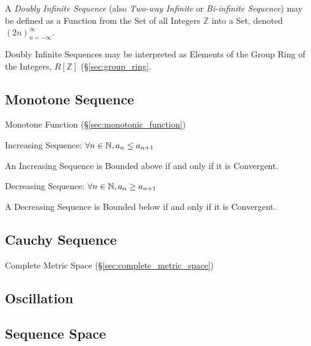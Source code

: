 A \emph{Doubly Infinite Sequence} (also \emph{Two-way Infinite} or
\emph{Bi-infinite Sequence}) may be defined as a Function from the Set
of all Integers $\mathbb{Z}$ into a Set, denoted
$(2n)^{\infty}_{n=-\infty}$.

Doubly Infinite Sequences may be interpreted as Elements of the Group
Ring of the Integers, $R[\mathbb{Z}]$ (\S\ref{sec:group_ring}.



\subsection{Monotone Sequence}\label{sec:monotone_sequence}

Monotone Function (\S\ref{sec:monotonic_function})

Increasing Sequence: $\forall n \in \mathbb{N}, a_n \leq a_{n+1}$

An Increasing Sequence is Bounded above if and only if it is
Convergent.

Decreasing Sequence: $\forall n \in \mathbb{N}, a_n \geq a_{n+1}$

A Decreasing Sequence is Bounded below if and only if it is
Convergent.



\subsection{Cauchy Sequence}\label{sec:cauchy_sequence}

Complete Metric Space (\S\ref{sec:complete_metric_space})



\subsection{Oscillation}\label{sec:oscillation}

\subsection{Sequence Space}\label{sec:sequence_space}

